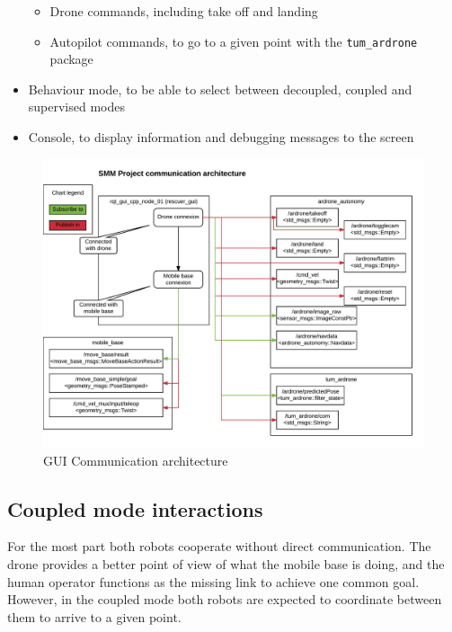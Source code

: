 \documentclass[11pt,a4paper]{article}
\begin{document}
\begin{itemize}
\begin{itemize}
		\item Drone commands, including take off and landing
		\item Autopilot commands, to go to a given point with the \verb!tum_ardrone! package	
	\end{itemize}
	
	\item Behaviour mode, to be able to select between decoupled, coupled and supervised modes
	
	\item Console, to display information and debugging messages to the screen


\end{itemize}






\begin{figure}[ht]	
\centering
\includegraphics[width=14cm]{communicationArchitecture.png}
\caption{GUI Communication architecture}
\end{figure}


\subsection{Coupled mode interactions}

For the most part both robots cooperate without direct communication. The drone provides a better point of view of what the mobile base is doing, and  the human operator functions as the missing link to achieve one common goal. However, in the coupled mode both robots are expected to coordinate between them to arrive to a given point.  
\end{document}
